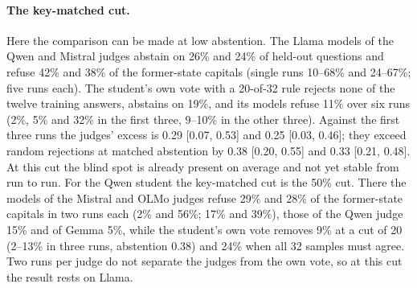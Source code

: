 \paragraph{The key-matched cut.} Here the comparison can be made at low abstention. The Llama models of the Qwen and Mistral judges abstain on 26\% and 24\% of held-out questions and refuse 42\% and 38\% of the former-state capitals (single runs 10--68\% and 24--67\%; five runs each). The student's own vote with a 20-of-32 rule rejects none of the twelve training answers, abstains on 19\%, and its models refuse 11\% over six runs (2\%, 5\% and 32\% in the first three, 9--10\% in the other three). Against the first three runs the judges' excess is 0.29 [0.07, 0.53] and 0.25 [0.03, 0.46]; they exceed random rejections at matched abstention by 0.38 [0.20, 0.55] and 0.33 [0.21, 0.48]. At this cut the blind spot is already present on average and not yet stable from run to run. For the Qwen student the key-matched cut is the 50\% cut. There the models of the Mistral and OLMo judges refuse 29\% and 28\% of the former-state capitals in two runs each (2\% and 56\%; 17\% and 39\%), those of the Qwen judge 15\% and of Gemma 5\%, while the student's own vote removes 9\% at a cut of 20 (2--13\% in three runs, abstention 0.38) and 24\% when all 32 samples must agree. Two runs per judge do not separate the judges from the own vote, so at this cut the result rests on Llama.

\begin{table}[t]
\small
\centering
\setlength{\tabcolsep}{4pt}
\caption{Designed graders on the capitals. Each rejects right answers on a fixed set of training questions of about the same size and pays wrong answers at random at a judge's rate. The last four rows are the copy of the Mistral judge's rejections with the verdict on the twelve set by hand. \emph{Rejected of 12}: how many of the twelve known former-state training answers are in the set. \emph{Of other capitals}: share of the other known capital training answers in the set. \emph{Random}: former-state refusal of models trained with random rejections at matched abstention.}
\label{tab:planted}
\end{table}

